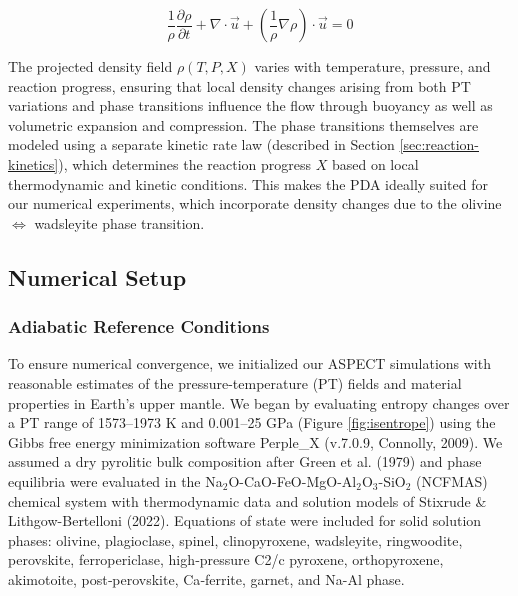 \documentclass[draft,linenumbers]{agujournal2019}
\begin{document}
\begin{equation}
  \frac{1}{\rho} \frac{\partial \rho}{\partial t} + \nabla \cdot \vec{u} + \left(\frac{1}{\rho} \nabla \rho \right) \cdot \vec{u} = 0
  \label{eq:continuity-expanded}
\end{equation}

The projected density field \(\rho(T, P, X)\) varies with temperature,
pressure, and reaction progress, ensuring that local density changes
arising from both PT variations and phase transitions influence the flow
through buoyancy as well as volumetric expansion and compression. The
phase transitions themselves are modeled using a separate kinetic rate
law (described in Section \ref{sec:reaction-kinetics}), which determines
the reaction progress \(X\) based on local thermodynamic and kinetic
conditions. This makes the PDA ideally suited for our numerical
experiments, which incorporate density changes due to the olivine
\(\Leftrightarrow\) wadsleyite phase transition.

\subsection{Numerical Setup}\label{sec:numerical-setup}

\subsubsection{Adiabatic Reference
Conditions}\label{sec:adiabatic-reference-conditions}

To ensure numerical convergence, we initialized our ASPECT simulations
with reasonable estimates of the pressure-temperature (PT) fields and
material properties in Earth's upper mantle. We began by evaluating
entropy changes over a PT range of 1573--1973 K and 0.001--25 GPa
(Figure \ref{fig:isentrope}) using the Gibbs free energy minimization
software Perple\_X (v.7.0.9, Connolly, 2009). We assumed a dry pyrolitic
bulk composition after Green et al. (1979) and phase equilibria were
evaluated in the Na\(_2\)O-CaO-FeO-MgO-Al\(_2\)O\(_3\)-SiO\(_2\)
(NCFMAS) chemical system with thermodynamic data and solution models of
Stixrude \& Lithgow-Bertelloni (2022). Equations of state were included
for solid solution phases: olivine, plagioclase, spinel, clinopyroxene,
wadsleyite, ringwoodite, perovskite, ferropericlase, high‐pressure C2/c
pyroxene, orthopyroxene, akimotoite, post‐perovskite, Ca‐ferrite,
garnet, and Na-Al phase.
\end{document}
